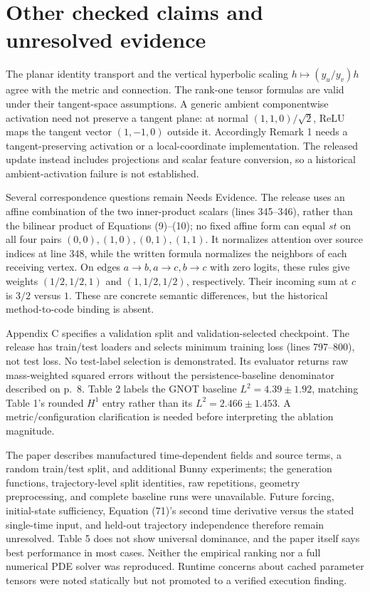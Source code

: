 \documentclass[10pt]{article}
\begin{document}
\section*{Other checked claims and unresolved evidence}
The planar identity transport and the vertical hyperbolic scaling \(h\mapsto(y_u/y_v)h\) agree with the metric and connection. The rank-one tensor formulas are valid under their tangent-space assumptions. A generic ambient componentwise activation need not preserve a tangent plane: at normal \((1,1,0)/\sqrt2\), ReLU maps the tangent vector \((1,-1,0)\) outside it. Accordingly Remark 1 needs a tangent-preserving activation or a local-coordinate implementation. The released update instead includes projections and scalar feature conversion, so a historical ambient-activation failure is not established.\par
Several correspondence questions remain Needs Evidence. The release uses an affine combination of the two inner-product scalars (lines 345–346), rather than the bilinear product of Equations (9)–(10); no fixed affine form can equal \(st\) on all four pairs \((0,0),(1,0),(0,1),(1,1)\). It normalizes attention over source indices at line 348, while the written formula normalizes the neighbors of each receiving vertex. On edges \(a\to b,a\to c,b\to c\) with zero logits, these rules give weights \((1/2,1/2,1)\) and \((1,1/2,1/2)\), respectively. Their incoming sum at \(c\) is \(3/2\) versus \(1\). These are concrete semantic differences, but the historical method-to-code binding is absent.\par
Appendix C specifies a validation split and validation-selected checkpoint. The release has train/test loaders and selects minimum training loss (lines 797–800), not test loss. No test-label selection is demonstrated. Its evaluator returns raw mass-weighted squared errors without the persistence-baseline denominator described on p. 8. Table 2 labels the GNOT baseline \(L^2=4.39\pm1.92\), matching Table 1’s rounded \(H^1\) entry rather than its \(L^2=2.466\pm1.453\). A metric/configuration clarification is needed before interpreting the ablation magnitude.\par
The paper describes manufactured time-dependent fields and source terms, a random train/test split, and additional Bunny experiments; the generation functions, trajectory-level split identities, raw repetitions, geometry preprocessing, and complete baseline runs were unavailable. Future forcing, initial-state sufficiency, Equation (71)’s second time derivative versus the stated single-time input, and held-out trajectory independence therefore remain unresolved. Table 5 does not show universal dominance, and the paper itself says best performance in most cases. Neither the empirical ranking nor a full numerical PDE solver was reproduced. Runtime concerns about cached parameter tensors were noted statically but not promoted to a verified execution finding.\par
\end{document}
